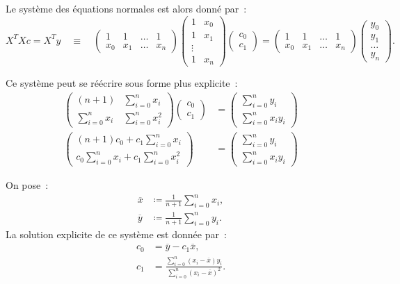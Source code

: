 \documentclass{article}
\theoremstyle{definition}
\theoremstyle{remark}
\begin{document}
		Le système des équations normales est alors donné par~:
		\[
			X^TXc = X^Ty\quad\equiv\quad
			\begin{pmatrix}
				1   & 1   & \ldots & 1 \\
				x_0 & x_1 & \ldots & x_n
			\end{pmatrix}
			\begin{pmatrix}
				1 & x_0 \\
				1 & x_1 \\
				\vdots \\
				1 & x_n
			\end{pmatrix}
			\begin{pmatrix}c_0 \\ c_1\end{pmatrix}
			=
			\begin{pmatrix}
				1   & 1   & \ldots & 1 \\
				x_0 & x_1 & \ldots & x_n
			\end{pmatrix}
			\begin{pmatrix} y_0 \\ y_1 \\ \ldots \\ y_n \end{pmatrix}.
		\]

		Ce système peut se réécrire sous forme plus explicite~:
		\begin{align*}
			\begin{pmatrix} (n+1) & \sum_{i=0}^nx_i \\ \sum_{i=0}^nx_i & \sum_{i=0}^nx_i^2 \end{pmatrix}
			\begin{pmatrix} c_0 \\ c_1 \end{pmatrix}
			&=
			\begin{pmatrix} \sum_{i=0}^ny_i \\ \sum_{i=0}^nx_iy_i \end{pmatrix}
			\\
			\begin{pmatrix}
				(n+1)c_0 + c_1\sum_{i=0}^nx_i \\
				c_0\sum_{i=0}^nx_i + c_1\sum_{i=0}^nx_i^2
			\end{pmatrix}
			&=
			\begin{pmatrix} \sum_{i=0}^ny_i \\ \sum_{i=0}^nx_iy_i \end{pmatrix}
		\end{align*}

		On pose~:
		\begin{align*}
			\overline x &\coloneqq \frac 1{n+1}\sum_{i=0}^nx_i, \\
			\overline y &\coloneqq \frac 1{n+1}\sum_{i=0}^ny_i.
		\end{align*}
		La solution explicite de ce système est donnée par~:
		\begin{align*}
			c_0 &= \overline y - c_1\overline x, \\
			c_1 &= \frac {\sum_{i=0}^n(x_i-\overline x)y_i}{\sum_{i=0}^n(x_i-\overline x)^2}.
		\end{align*}
\end{document}
